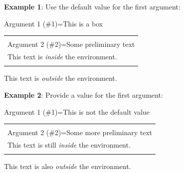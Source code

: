 \documentclass{article}
\newenvironment{boxed}[2][This is a box]
{\begin{center}
		Argument 1 (\#1)=#1\\[1ex]
		\begin{tabular}{|p{0.9\textwidth}|}
			\hline\\
			Argument 2 (\#2)=#2\\[2ex]
		}
		{ 
			\\\\\hline
		\end{tabular} 
	\end{center}
}
\begin{document}
	\textbf{Example 1}: Use the default value for the first argument:
	
	\begin{boxed}{Some preliminary text}
		This text is \textit{inside} the environment.
	\end{boxed}
	
	This text is \textit{outside} the environment.
	
	\vskip12pt
	
	\textbf{Example 2}: Provide a value for the first argument:
	
	\begin{boxed}[This is not the default value]{Some more preliminary text}
		This text is still \textit{inside} the environment.
	\end{boxed}
	
	This text is also \textit{outside} the environment.
\end{document}
